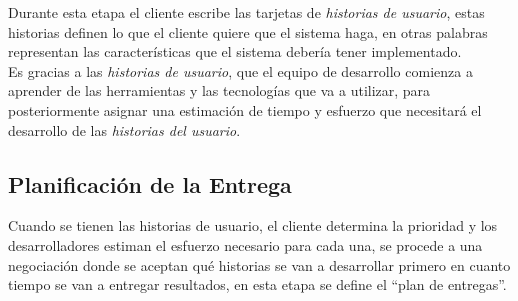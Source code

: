 

           Durante esta etapa el cliente escribe las tarjetas de \emph{historias de usuario}, estas historias definen lo que el cliente quiere que el sistema haga, en otras palabras representan las características que el sistema debería tener implementado.\\

           Es gracias a las \emph{historias de usuario}, que el equipo de desarrollo comienza a aprender de las herramientas y las tecnologías que va a utilizar, para posteriormente  asignar una estimación de tiempo y esfuerzo que necesitará el desarrollo de las \emph{historias del usuario}.\\


         \subsection{Planificación de la Entrega}
         \label{sub:planeacion}

       Cuando se tienen las historias de usuario, el cliente determina la prioridad y los desarrolladores estiman el esfuerzo necesario para cada una, se procede a una negociación donde se aceptan qué historias se van a desarrollar primero en cuanto tiempo se van a entregar resultados, en esta etapa se define el ``plan de entregas''. \\


